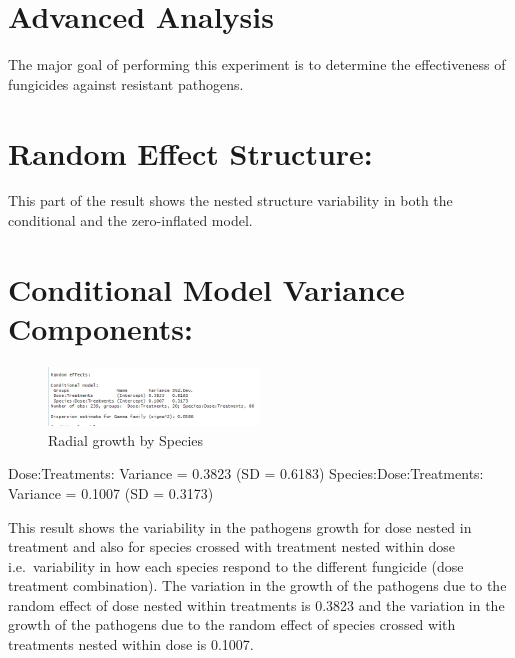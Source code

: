 \documentclass[
  10pt,
  letterpaper,
  twocolumn]{article}
\begin{document}
\hypertarget{advanced-analysis}{%
\section{Advanced Analysis}\label{advanced-analysis}}

The major goal of performing this experiment is to determine the
effectiveness of fungicides against resistant pathogens.

\hypertarget{random-effect-structure}{%
\section{Random Effect Structure:}\label{random-effect-structure}}

This part of the result shows the nested structure variability in both
the conditional and the zero-inflated model.

\hypertarget{conditional-model-variance-components}{%
\section{Conditional Model Variance
Components:}\label{conditional-model-variance-components}}

\begin{figure}

{\centering \includegraphics[width=0.5\textwidth,height=\textheight]{Fig10.png}

}

\caption{Radial growth by Species}

\end{figure}

Dose:Treatments: Variance = 0.3823 (SD = 0.6183)
Species:Dose:Treatments: Variance = 0.1007 (SD = 0.3173)

This result shows the variability in the pathogens growth for dose
nested in treatment and also for species crossed with treatment nested
within dose i.e.~variability in how each species respond to the
different fungicide (dose treatment combination). The variation in the
growth of the pathogens due to the random effect of dose nested within
treatments is 0.3823 and the variation in the growth of the pathogens
due to the random effect of species crossed with treatments nested
within dose is 0.1007.
\end{document}
